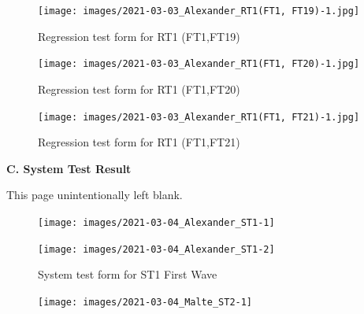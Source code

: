 \documentclass{article}
\begin{document}
  \begin{figure}
     \centering
     \texttt{[image: images/2021-03-03\_Alexander\_RT1(FT1, FT19)-1.jpg]}
     \renewcommand\figurename{Figure}
     \caption{Regression test form for RT1 (FT1,FT19)}
     \label{fig:my_label}
 \end{figure}
 
  \begin{figure}
     \centering
     \texttt{[image: images/2021-03-03\_Alexander\_RT1(FT1, FT20)-1.jpg]}
     \renewcommand\figurename{Figure}
     \caption{Regression test form for RT1 (FT1,FT20)}
     \label{fig:my_label}
 \end{figure}
 
  \begin{figure}
     \centering
     \texttt{[image: images/2021-03-03\_Alexander\_RT1(FT1, FT21)-1.jpg]}
     \renewcommand\figurename{Figure}
     \caption{Regression test form for RT1 (FT1,FT21)}
     \label{fig:my_label}
 \end{figure}
 

\newpage
\begin{flushleft}
{\large \textbf{C. System Test Result}}
\end{flushleft}

\vspace*{\fill}
                \hfill
                \begin{center}
                This page unintentionally left blank.
                \end{center}
                \vspace{\fill}
                \thispagestyle{empty}

\begin{figure}
     \centering
     \texttt{[image: images/2021-03-04\_Alexander\_ST1-1]}
     \renewcommand\figurename{Figure}
     \label{fig:my_label}
 \end{figure}
 
 \begin{figure}
     \centering
     \texttt{[image: images/2021-03-04\_Alexander\_ST1-2]}
     \renewcommand\figurename{Figure}
     \caption{System test form for ST1 First Wave}
     \label{fig:my_label}
 \end{figure}


\begin{figure}
     \centering
     \texttt{[image: images/2021-03-04\_Malte\_ST2-1]}
     \renewcommand\figurename{Figure}
     \label{fig:my_label}
 \end{figure}
 
\end{document}
